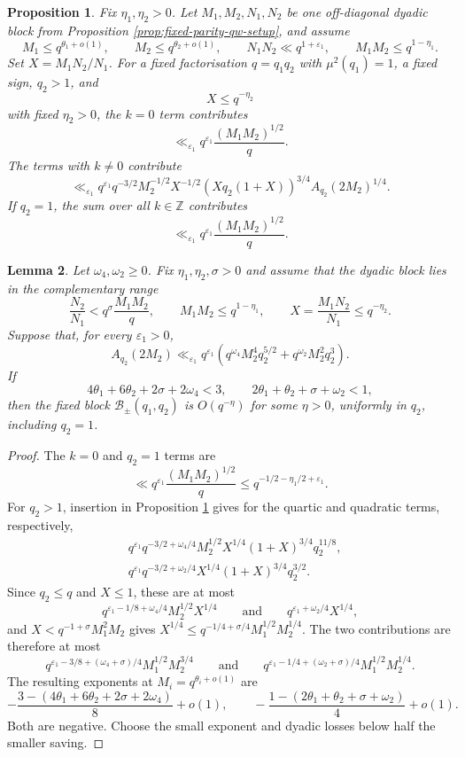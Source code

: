 \documentclass[10pt,a4paper]{amsart}
\newtheorem{lem}{Lemma}
\newtheorem{prop}[lem]{Proposition}
\renewcommand{\ge}{\geqslant}
\renewcommand{\le}{\leqslant}
\begin{document}
\begin{prop}\label{prop:qw-preinsertion}
Fix $\eta_1,\eta_2>0$. Let $M_1,M_2,N_1,N_2$ be one off-diagonal dyadic block from Proposition \ref{prop:fixed-parity-qw-setup}, and assume
$$
M_1\le q^{\theta_1+o(1)},\qquad
M_2\le q^{\theta_2+o(1)},\qquad
N_1N_2\ll q^{1+\varepsilon_1},\qquad
M_1M_2\le q^{1-\eta_1}.
$$
Set $X=M_1N_2/N_1$. For a fixed factorisation $q=q_1q_2$ with $\mu^2(q_1)=1$, a fixed sign, $q_2>1$, and
$$
X\le q^{-\eta_2}
$$
with fixed $\eta_2>0$, the $k=0$ term contributes
$$
\ll_{\varepsilon_1} q^{\varepsilon_1}\frac{(M_1M_2)^{1/2}}{q}.
$$
The terms with $k\ne0$ contribute
$$
\ll_{\varepsilon_1}
q^{\varepsilon_1} q^{-3/2}M_2^{-1/2}X^{-1/2}
(Xq_2(1+X))^{3/4}A_{q_2}(2M_2)^{1/4}.
$$
If $q_2=1$, the sum over all $k\in\mathbb Z$ contributes
$$
\ll_{\varepsilon_1} q^{\varepsilon_1}\frac{(M_1M_2)^{1/2}}{q}.
$$
\end{prop}

\begin{lem}\label{lem:two-term-mixed-block-insertion}
Let $\omega_4,\omega_2\ge0$. Fix $\eta_1,\eta_2,\sigma>0$ and assume that the dyadic block lies in the complementary range
$$
\frac{N_2}{N_1}<q^\sigma\frac{M_1M_2}{q},\qquad
M_1M_2\le q^{1-\eta_1},\qquad
X=\frac{M_1N_2}{N_1}\le q^{-\eta_2}.
$$
Suppose that, for every $\varepsilon_1>0$,
$$
A_{q_2}(2M_2)\ll_{\varepsilon_1} q^{\varepsilon_1}
(q^{\omega_4}M_2^4q_2^{5/2}+q^{\omega_2}M_2^2q_2^3).
$$
If
$$
4\theta_1+6\theta_2+2\sigma+2\omega_4<3,
\qquad
2\theta_1+\theta_2+\sigma+\omega_2<1,
$$
 then the fixed block $\mathcal B_\pm(q_1,q_2)$ is $O(q^{-\eta})$ for some $\eta>0$, uniformly in $q_2$, including $q_2=1$.
\end{lem}

\begin{proof}
The $k=0$ and $q_2=1$ terms are
$$
\ll q^{\varepsilon_1}\frac{(M_1M_2)^{1/2}}q\le q^{-1/2-\eta_1/2+\varepsilon_1}.
$$
 For $q_2>1$, insertion in Proposition \ref{prop:qw-preinsertion} gives for the quartic and quadratic terms, respectively,
$$
\begin{aligned}
&q^{\varepsilon_1}q^{-3/2+\omega_4/4}M_2^{1/2}X^{1/4}(1+X)^{3/4}q_2^{11/8},\\
&q^{\varepsilon_1}q^{-3/2+\omega_2/4}X^{1/4}(1+X)^{3/4}q_2^{3/2}.
\end{aligned}
$$
Since $q_2\le q$ and $X\le1$, these are at most
$$
q^{\varepsilon_1-1/8+\omega_4/4}M_2^{1/2}X^{1/4}\qquad\text{and}\qquad q^{\varepsilon_1+\omega_2/4}X^{1/4},
$$
and $X<q^{-1+\sigma}M_1^2M_2$ gives $X^{1/4}\le q^{-1/4+\sigma/4}M_1^{1/2}M_2^{1/4}$. The two contributions are therefore at most
$$
q^{\varepsilon_1-3/8+(\omega_4+\sigma)/4}M_1^{1/2}M_2^{3/4}
\qquad\text{and}\qquad
q^{\varepsilon_1-1/4+(\omega_2+\sigma)/4}M_1^{1/2}M_2^{1/4}.
$$
The resulting exponents at $M_i=q^{\theta_i+o(1)}$ are
$$
-\frac{3-(4\theta_1+6\theta_2+2\sigma+2\omega_4)}{8}+o(1),
\qquad
-\frac{1-(2\theta_1+\theta_2+\sigma+\omega_2)}{4}+o(1).
$$
Both are negative. Choose the small exponent and dyadic losses below half the smaller saving.
\end{proof}
\end{document}
